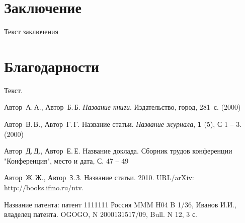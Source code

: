 \documentclass{nsart_eng}
\begin{document}
\section{Заключение}
Текст заключения

\section*{Благодарности}
Текст.

\begin{thebibliography}{99}
Автор~А.\,А., Автор~Б.\,Б. {\it Название книги}.  Издательство,  город, 281~с. (2000)

Автор~В.\,В., Автор~Г.\,Г. Название статьи. {\it Название журнала}, {\bf 1} (5), С 1 -- 3. (2000)

Автор~Д.\,Д., Автор~Е.\,Е. Название доклада. Сборник трудов конференции "Конференция", место и дата, С. 47 -- 49

Автор~Ж.\,Ж., Автор~З.\,З. Название статьи.  2010.
URL/arXiv: http://books.ifmo.ru/ntv.

Название патента: патент 1111111 Россия MMM H04 B 1/36, Иванов И.И., владелец патента. OGOGO, N 2000131517/09, Bull. N 12, 3 с.


\end{thebibliography}
\end{document}

